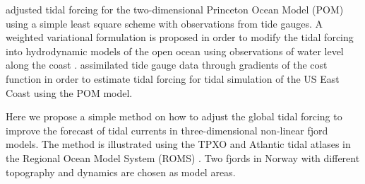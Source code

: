 \cite{chen99} adjusted tidal forcing for the two-dimensional Princeton Ocean Model (POM) using a simple least square scheme with observations from tide gauges. A weighted variational formulation is proposed in order to modify the tidal forcing into hydrodynamic models of the open ocean using observations of water level along the coast \cite[]{bennett82}. \cite[]{zhang03} assimilated tide gauge data through gradients of the cost function in order to estimate tidal forcing for tidal simulation of the US East Coast using the POM model. 

Here we propose a simple method on how to adjust the global tidal forcing to improve the forecast of tidal currents in three-dimensional non-linear fjord models. The method is illustrated using the TPXO and Atlantic tidal atlases \cite[]{egbert94,egbert02} in the Regional Ocean Model System (ROMS) \cite[]{shchepetkin05,shchepetkin09,haidvogel08}. Two fjords in Norway with different topography and dynamics are chosen as model areas. 
